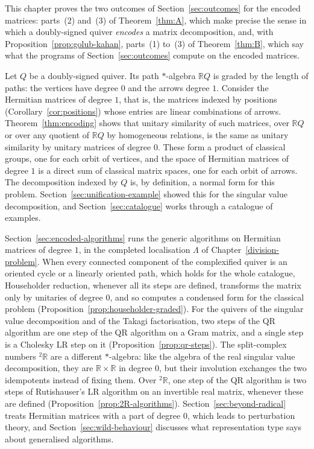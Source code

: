 \documentclass[12pt, a4paper]{report}
\theoremstyle{plain}
\theoremstyle{definition}
\theoremstyle{remark}
\theoremstyle{plain}
\newcommand{\RR}{\mathbb{R}}
\newcommand{\twoR}{{}^{2}\mathbb{R}}
\begin{document}
This chapter proves the two outcomes of Section~\ref{sec:outcomes} for the encoded matrices: parts~(2) and~(3) of Theorem~\ref{thm:A}, which make precise the sense in which a doubly-signed quiver \emph{encodes} a matrix decomposition, and, with Proposition~\ref{prop:golub-kahan}, parts~(1) to~(3) of Theorem~\ref{thm:B}, which say what the programs of Section~\ref{sec:outcomes} compute on the encoded matrices.

Let $Q$ be a doubly-signed quiver. Its path $*$-algebra $\RR Q$ is graded by the length of paths: the vertices have degree $0$ and the arrows degree $1$. Consider the Hermitian matrices of degree $1$, that is, the matrices indexed by positions (Corollary~\ref{cor:positions}) whose entries are linear combinations of arrows. Theorem~\ref{thm:encoding} shows that unitary similarity of such matrices, over $\RR Q$ or over any quotient of $\RR Q$ by homogeneous relations, is the same as unitary similarity by unitary matrices of degree $0$. These form a product of classical groups, one for each orbit of vertices, and the space of Hermitian matrices of degree $1$ is a direct sum of classical matrix spaces, one for each orbit of arrows. The decomposition indexed by $Q$ is, by definition, a normal form for this problem. Section~\ref{sec:unification-example} showed this for the singular value decomposition, and Section~\ref{sec:catalogue} works through a catalogue of examples.

Section~\ref{sec:encoded-algorithms} runs the generic algorithms on Hermitian matrices of degree $1$, in the completed localisation $\Lambda$ of Chapter~\ref{division-problem}. When every connected component of the complexified quiver is an oriented cycle or a linearly oriented path, which holds for the whole catalogue, Householder reduction, whenever all its steps are defined, transforms the matrix only by unitaries of degree $0$, and so computes a condensed form for the classical problem (Proposition~\ref{prop:householder-graded}). For the quivers of the singular value decomposition and of the Takagi factorisation, two steps of the QR algorithm are one step of the QR algorithm on a Gram matrix, and a single step is a Cholesky LR step on it (Proposition~\ref{prop:qr-steps}). The split-complex numbers $\twoR$ are a different $*$-algebra: like the algebra of the real singular value decomposition, they are $\RR\times\RR$ in degree $0$, but their involution exchanges the two idempotents instead of fixing them. Over $\twoR$, one step of the QR algorithm is two steps of Rutishauser's LR algorithm on an invertible real matrix, whenever these are defined (Proposition~\ref{prop:2R-algorithms}). Section~\ref{sec:beyond-radical} treats Hermitian matrices with a part of degree $0$, which leads to perturbation theory, and Section~\ref{sec:wild-behaviour} discusses what representation type says about generalised algorithms.
\end{document}

